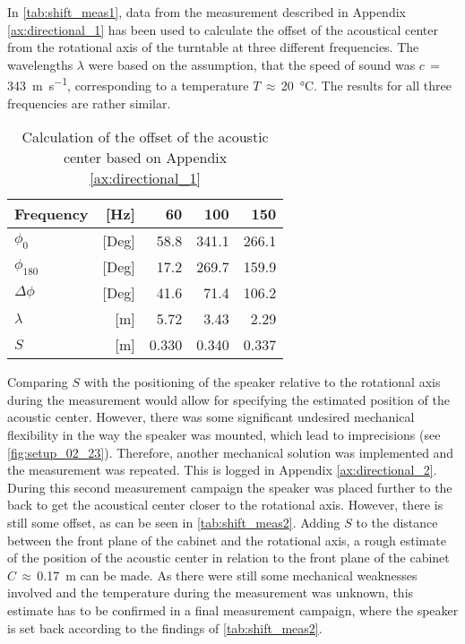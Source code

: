In \autoref{tab:shift_meas1}, data from the measurement described in Appendix \ref{ax:directional_1} has been used to calculate the offset of the acoustical center from the rotational axis of the turntable at three different frequencies. The wavelengths \(\lambda\) were based on the assumption, that the speed of sound was \(c\,=\,\)\SI{343}{\meter\per\second}, corresponding to a temperature \(T\,\approx\,\)\SI{20}{\celsius}. The results for all three frequencies are rather similar.
\begin{table}[H]
\centering
\caption{Calculation of the offset of the acoustic center based on Appendix \ref{ax:directional_1}}
\label{tab:shift_meas1}
\begin{tabular}{|lr|r|r|r|}
\hline
Frequency              & {[}Hz{]}  & 60    & 100    & 150    \\ \hline
\(\phi_0\)             & {[}Deg{]} & 58.8  & 341.1  & 266.1  \\ \hline
\(\phi_{180}\)         & {[}Deg{]} & 17.2  & 269.7  & 159.9  \\ \hline
\(\Delta\phi\)         & {[}Deg{]} & 41.6  & 71.4   & 106.2  \\ \hline
\(\lambda\)            & {[}m{]}   & 5.72  & 3.43   & 2.29   \\ \hline
\(S\)                  & {[}m{]}   & 0.330 & 0.340  & 0.337  \\ \hline
\end{tabular}
\end{table}
Comparing \(S\) with the positioning of the speaker relative to the rotational axis during the measurement would allow for specifying the estimated position of the acoustic center. However, there was some significant undesired mechanical flexibility in the way the speaker was mounted, which lead to imprecisions (see \autoref{fig:setup_02_23}). Therefore, another mechanical solution was implemented and the measurement was repeated. This is  logged in Appendix \ref{ax:directional_2}.
During this second measurement campaign the speaker was placed further to the back to get the acoustical center closer to the rotational axis. However, there is still some offset, as can be seen in \autoref{tab:shift_meas2}.
Adding \(S\) to the distance between the front plane of the cabinet and the rotational axis, a rough estimate of the position of the acoustic center in relation to the front plane of the cabinet \(C\,\approx\,\)\SI{0.17}{\meter} can be made. As there were still some mechanical weaknesses involved and the temperature during the measurement was unknown, this estimate has to be confirmed in a final measurement campaign, where the speaker is set back according to the findings of \autoref{tab:shift_meas2}.\\
